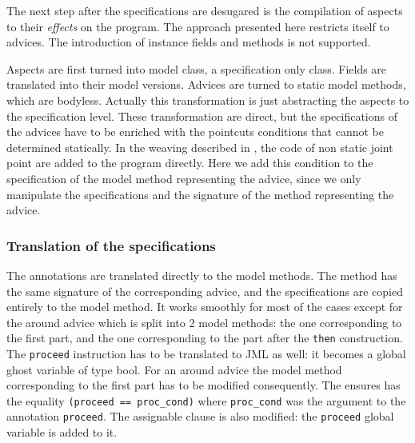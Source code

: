 The next step after the specifications are desugared is the
compilation of aspects to their {\it effects} on the program. The
approach presented here restricts itself to advices. The introduction of
instance fields and methods is not supported. 

Aspects are first turned into model class, a specification only class.
Fields are translated into their model versions.
Advices are turned to static model methods, which are bodyless.
Actually this transformation is just abstracting the aspects to 
the specification level. 
These transformation are direct, but the
specifications of the advices have to be enriched with the pointcuts
conditions that cannot be determined statically.  In the weaving
described in \cite{weaving04}, the code of non static joint point are
added to the program directly.  Here we add this condition to the
specification of the model method representing the advice, since we
only manipulate the specifications and the signature of the method
representing the advice.

\subsubsection{Translation of the specifications}
The annotations are translated directly to the model methods. The
method has the same signature of the corresponding advice, and the
specifications are copied entirely to the model method. It works
smoothly for most of the cases except for the around advice which is
split into 2 model methods: the one corresponding to the first part,
and the one corresponding to the part after the {\tt then}
construction.  The {\tt proceed} instruction has to be translated to
 JML as well: it becomes a global ghost variable of type bool.  For an
 around advice the model method corresponding to the first part has to
 be modified consequently.  The ensures has the equality {\tt (proceed
 == proc\_cond)} where {\tt proc\_cond} was the argument to the
 annotation {\tt proceed}. The assignable clause is also modified: the
 {\tt proceed} global variable is added to it.
